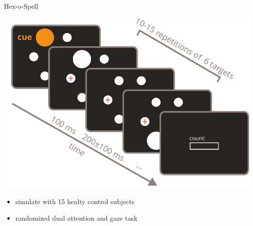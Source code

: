 \documentclass{kul-ulille-beamer}
\begin{document}
\begin{frame}
    \hfill
    \begin{minipage}[c]{.25\textwidth}
    
      Hex-o-Spell {\tiny\cite{Treder2010}}
    \end{minipage}\hfill%
    \begin{minipage}[c]{.3\textwidth}
      \includegraphics[width=\textwidth]{figures/covert/timeline.pdf}
    \end{minipage}
    \hfill%
    \begin{minipage}[c]{.25\textwidth}
      \begin{itemize}
        \item simulate with 15 healty control subjects
        \item randomized dual attention and gaze task
      \end{itemize}
    \end{minipage}

\end{frame}
\end{document}
